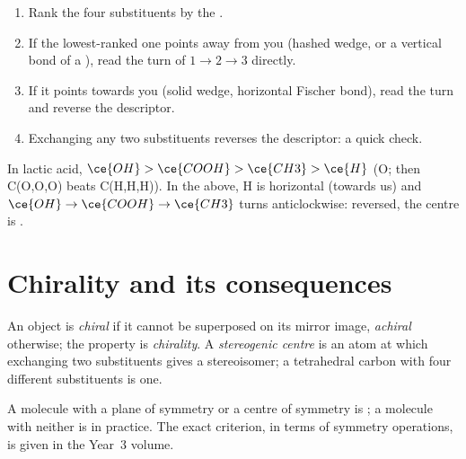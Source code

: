 \begin{method}\label{met:b1:stereochemistry-in-depth:cip}
\begin{enumerate}
  \item Rank the four substituents by the .
  \item If the lowest-ranked one points away from you (hashed wedge, or a
        vertical bond of a ), read the turn of
        $1 \to 2 \to 3$ directly.
  \item If it points towards you (solid wedge, horizontal Fischer bond),
        read the turn and reverse the descriptor.
  \item Exchanging any two substituents reverses the descriptor: a quick
        check.
\end{enumerate}
In lactic acid, $\ce{OH} > \ce{COOH} > \ce{CH3} > \ce{H}$ (O; then C(O,O,O)
beats C(H,H,H)). In the  above, H is horizontal
(towards us) and $\ce{OH} \to \ce{COOH} \to \ce{CH3}$ turns anticlockwise:
reversed, the centre is .
\end{method}

\section{Chirality and its consequences}

\begin{definition}\label{def:b1:stereochemistry-in-depth:stereocentre}
An object is \emph{chiral} if it cannot be superposed on its
mirror image, \emph{achiral} otherwise; the property is
\emph{chirality}. A \emph{stereogenic
centre} is an atom at which exchanging two
substituents gives a stereoisomer; a tetrahedral carbon with four
different substituents is one.
\end{definition}

A molecule with a plane of symmetry or a centre of symmetry is ;
a molecule with neither is  in practice. The exact criterion, in
terms of symmetry operations, is given in the Year~3 volume.

